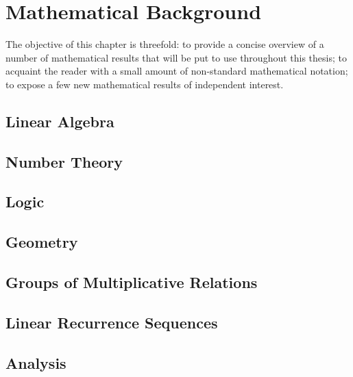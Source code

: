 \chapter{Mathematical Background}
The objective of this chapter is threefold: to provide a concise overview of a number of mathematical results that will be put to use throughout this thesis; to acquaint the reader with a small amount of non-standard mathematical notation; to expose a few new mathematical results of independent interest.
\label{ch:background}
\section{Linear Algebra}



\section{Number Theory}



\section{Logic}

\section{Geometry}


\section{Groups of Multiplicative Relations}

\section{Linear Recurrence Sequences}

\section{Analysis}

